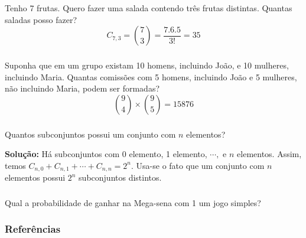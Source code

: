 \documentclass[14pt,aspectratio=1610]{beamer}
\begin{document}
\begin{frame}{}
\frametitle{}
\begin{block}{}
\justifying
Tenho 7 frutas. Quero fazer uma salada contendo três frutas distintas. Quantas saladas posso fazer?\pause
$$C_{7,3}=\binom{7}{3}=\dfrac{7.6.5}{3!}=35$$
\end{block}
\end{frame}

\begin{frame}{}
\frametitle{}
\begin{block}{}
\justifying
Suponha que em um grupo existam 10 homens, incluindo João, e 10 mulheres, incluindo Maria. Quantas comissões com 5 homens, incluindo João e 5 mulheres, não incluindo Maria, podem ser formadas?\pause
$$\binom{9}{4}\times \binom{9}{5}=15876$$
\end{block}
\end{frame}

\begin{frame}{}
\frametitle{}
\begin{block}{}
\justifying
Quantos subconjuntos possui um conjunto com $n$ elementos?\pause

{\bf Solução:} Há subconjuntos com 0 elemento, 1 elemento, $\cdots,$ e $n$ elementos. Assim, temos $C_{n,0}+C_{n,1}+\cdots+C_{n,n}=2^{n}.$ Usa-se o fato que um conjunto com $n$ elementos possui $2^{n}$ subconjuntos distintos.

\end{block}
\end{frame}

\begin{frame}{}
\frametitle{}
\begin{block}{}
\justifying
Qual a probabilidade de ganhar na Mega-sena com 1 um jogo simples?
\end{block}
\end{frame}

\begin{frame}%
\frametitle{\bf Referências}

\end{frame}
\end{document}
